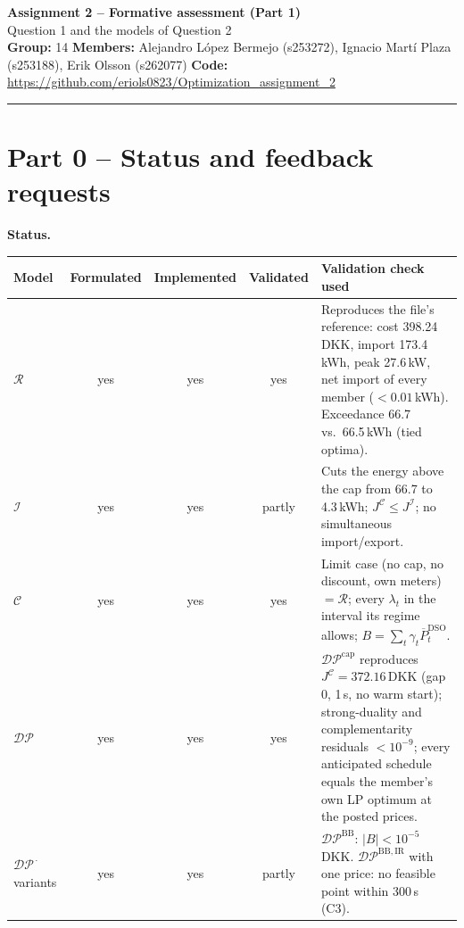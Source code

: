 \documentclass[10pt,a4paper]{article}
\newcommand{\cR}{\mathcal{R}}
\newcommand{\cI}{\mathcal{I}}
\newcommand{\cC}{\mathcal{C}}
\newcommand{\cDP}{\mathcal{DP}}
\newcommand{\Pcap}{\overline P^{\mathrm{DSO}}_t}
\newcommand{\qitem}[2]{\par\smallskip\noindent{\color{dtured}\textbf{#1}}\enspace\textbf{#2}\par\nopagebreak}
\begin{document}
{\color{dtunavy}\Large\bfseries Assignment 2 -- Formative assessment (Part 1)}\\[1pt]
{\normalsize Question 1 and the models of Question 2}\\[2pt]
\textbf{Group:} 14 \qquad \textbf{Members:} Alejandro L\'opez Bermejo (s253272), Ignacio Mart\'i Plaza (s253188), Erik Olsson (s262077)
\quad\textbf{Code:} \url{https://github.com/eriols0823/Optimization_assignment_2}

\smallskip
\hrule

\section*{Part 0 -- Status and feedback requests}

\qitem{0.1}{Status.}
{\small
\begin{tabularx}{\linewidth}{@{}l c c c X@{}}
\toprule
Model & Formulated & Implemented & Validated & Validation check used \\
\midrule
$\cR$ & yes & yes & yes & Reproduces the file's reference: cost 398.24\,DKK, import 173.4\,kWh, peak 27.6\,kW, net import of every member ($<0.01$\,kWh). Exceedance 66.7 vs.\ 66.5\,kWh (tied optima). \\
$\cI$ & yes & yes & partly & Cuts the energy above the cap from 66.7 to 4.3\,kWh; $J^{\cC}\le J^{\cI}$; no simultaneous import/export. \\
$\cC$ & yes & yes & yes & Limit case (no cap, no discount, own meters) $=\cR$; every $\lambda_t$ in the interval its regime allows; $B=\sum_t\gamma_t\Pcap$. \\
$\cDP$ & yes & yes & yes & $\cDP^{\mathrm{cap}}$ reproduces $J^{\cC}=372.16$\,DKK (gap 0, 1\,s, no warm start); strong-duality and complementarity residuals $<10^{-9}$; every anticipated schedule equals the member's own LP optimum at the posted prices. \\
$\cDP^{\,\cdot}$ variants & yes & yes & partly & $\cDP^{\mathrm{BB}}$: $|B|<10^{-5}$\,DKK. $\cDP^{\mathrm{BB,IR}}$ with one price: no feasible point within 300\,s (C3). \\
\bottomrule
\end{tabularx}}
\end{document}
